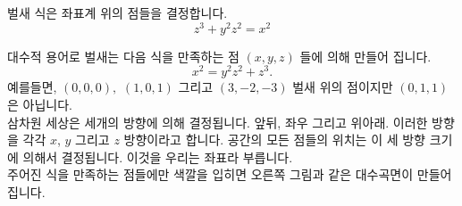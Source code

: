 \begin{surferPage}{벌새}
식은 좌표계 위의 점들을 결정합니다. \\
  
  \smallskip
\[z^3+ y^2	z^2	= x^2\]

\singlespacing
대수적 용어로 벌새는 다음 식을 만족하는 점 $(x, y, z)$ 들에 의해 만들어 집니다.
\smallskip
\[ x^2= y^2z^2+z^3.\]
\smallskip
예를들면, $(0,0,0),$ $(1,0,1)$ 그리고 $(3,-2,-3)$ 벌새 위의 점이지만 $(0,1,1)$ 은 아닙니다.\\
 \singlespacing
삼차원 세상은 세개의 방향에 의해 결정됩니다. 앞뒤, 좌우 그리고 위아래. 이러한 방향을 각각 $x$, $y$ 그리고 $z$ 방향이라고 합니다. 공간의 모든 점들의 위치는 이 세 방향 크기에 의해서 결정됩니다. 이것을 우리는 좌표라 부릅니다.\\
\singlespacing
주어진 식을 만족하는 점들에만 색깔을 입히면 오른쪽 그림과 같은 대수곡면이 만들어 집니다.
\end{surferPage}
